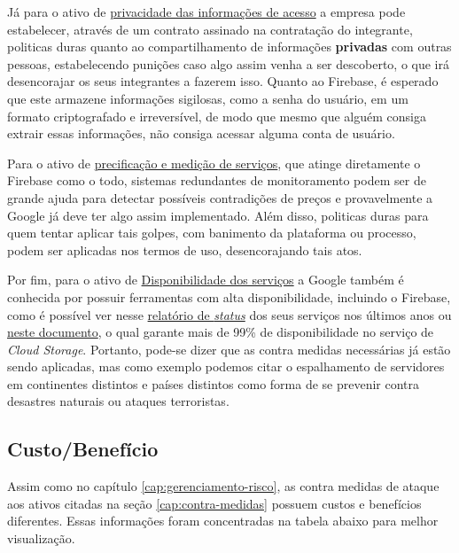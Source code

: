 \documentclass[
    openany,
    12pt,               %
    twoside,            %
    a4paper,            %
    english,            %
    brazil,             %
    ]{abntex2}
\begin{document}
Já para o ativo de \hyperref[cap:privacidade-informacoes]{privacidade das informações de acesso} a empresa pode estabelecer, através de um contrato assinado na contratação do integrante, politicas duras quanto ao compartilhamento de informações \textbf{privadas} com outras pessoas, estabelecendo punições caso algo assim venha a ser descoberto, o que irá desencorajar os seus integrantes a fazerem isso. Quanto ao Firebase, é esperado que este armazene informações sigilosas, como a senha do usuário, em um formato criptografado e irreversível, de modo que mesmo que alguém consiga extrair essas informações, não consiga acessar alguma conta de usuário.

Para o ativo de \hyperref[cap:precificacao-servicos]{precificação e medição de serviços}, que atinge diretamente o Firebase como o todo, sistemas redundantes de monitoramento podem ser de grande ajuda para detectar possíveis contradições de preços e provavelmente a Google já deve ter algo assim implementado. Além disso, politicas duras para quem tentar aplicar tais golpes, com banimento da plataforma ou processo, podem ser aplicadas nos termos de uso, desencorajando tais atos.

Por fim, para o ativo de \hyperref[cap:disponibilidade-servicos]{Disponibilidade dos serviços} a Google também é conhecida por possuir ferramentas com alta disponibilidade, incluindo o Firebase, como é possível ver nesse \href{https://support.google.com/a/answer/6329207?hl=en}{relatório de \textit{status}} dos seus serviços nos últimos anos ou \href{https://firebase.google.com/terms/service-level-agreement/cloud-storage}{neste documento}, o qual garante mais de 99\% de disponibilidade no serviço de \textit{Cloud Storage}. Portanto, pode-se dizer que as contra medidas necessárias já estão sendo aplicadas, mas como exemplo podemos citar o espalhamento de servidores em continentes distintos e países distintos como forma de se prevenir contra desastres naturais ou ataques terroristas.

\subsection{Custo/Benefício}
\label{cap:custo-beneficio}

Assim como no capítulo \ref{cap:gerenciamento-risco}, as contra medidas de ataque aos ativos citadas na seção \ref{cap:contra-medidas} possuem custos e benefícios diferentes. Essas informações foram concentradas na tabela abaixo para melhor visualização.
\end{document}

